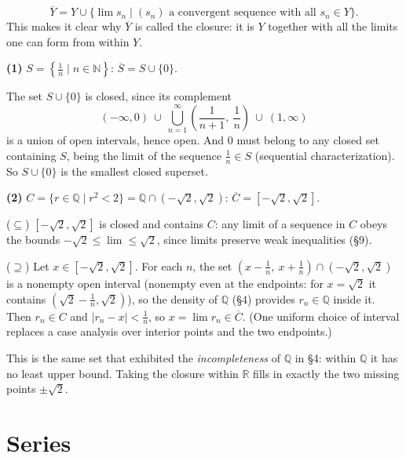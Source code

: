 \documentclass[11pt]{report}
\begin{document}
\begin{propbox}
\[
\overline{Y} = Y \cup \{ \lim s_n \mid (s_n) \text{ a convergent sequence with all } s_n \in Y \}.
\]
This makes it clear why $\overline{Y}$ is called the closure: it is $Y$ together with all the limits one can form from within $Y$.
\end{propbox}

\begin{exbox}
\textbf{(1)} $S = \left\{ \tfrac1n \mid n \in \mathbb{N} \right\}$: \quad $\overline S = S \cup \{0\}$.

The set $S \cup \{0\}$ is closed, since its complement
\[
(-\infty, 0) \ \cup\ \bigcup_{n=1}^{\infty} \left( \frac{1}{n+1},\ \frac1n \right) \ \cup\ (1, \infty)
\]
is a union of open intervals, hence open. And $0$ must belong to any closed set containing $S$, being the limit of the sequence $\tfrac1n \in S$ (sequential characterization). So $S \cup \{0\}$ is the smallest closed superset.

\textbf{(2)} $C = \{ r \in \mathbb{Q} \mid r^2 < 2 \} = \mathbb{Q} \cap (-\sqrt2, \sqrt2)$: \quad $\overline C = [-\sqrt2, \sqrt2]$.

($\subseteq$) $[-\sqrt2, \sqrt2]$ is closed and contains $C$: any limit of a sequence in $C$ obeys the bounds $-\sqrt2 \leq \lim \leq \sqrt2$, since limits preserve weak inequalities (\S 9).

($\supseteq$) Let $x \in [-\sqrt2, \sqrt2]$. For each $n$, the set $\left(x - \tfrac1n,\ x + \tfrac1n\right) \cap (-\sqrt2, \sqrt2)$ is a nonempty open interval (nonempty even at the endpoints: for $x = \sqrt2$ it contains $(\sqrt2 - \tfrac1n, \sqrt2)$), so the density of $\mathbb{Q}$ (\S 4) provides $r_n \in \mathbb{Q}$ inside it. Then $r_n \in C$ and $|r_n - x| < \tfrac1n$, so $x = \lim r_n \in \overline C$. (One uniform choice of interval replaces a case analysis over interior points and the two endpoints.)

This is the same set that exhibited the \emph{incompleteness} of $\mathbb{Q}$ in \S 4: within $\mathbb{Q}$ it has no least upper bound. Taking the closure within $\mathbb{R}$ fills in exactly the two missing points $\pm\sqrt2$.
\end{exbox}


\section{Series}
\end{document}
